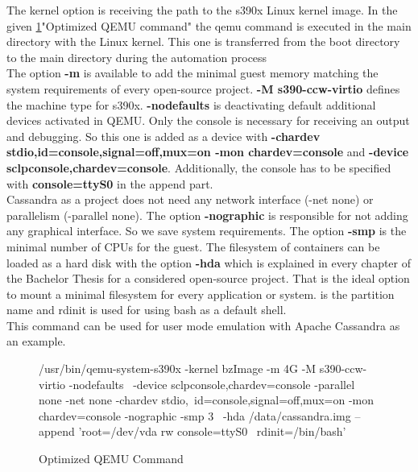 The kernel option is receiving the path to the s390x Linux kernel image. In the given \ref{QEMU-Command}"Optimized QEMU command" the qemu command is executed in the main directory with the Linux kernel. This one is transferred from the boot directory to the main directory during the automation process \\  
The option \textbf{-m} is available to add the minimal guest memory matching the system requirements of every open-source project. \textbf{-M s390-ccw-virtio} defines the machine type for s390x.
\textbf{-nodefaults} is deactivating default additional devices activated in QEMU. 
Only the console is necessary for receiving an output and debugging. 
So this one is added as a device with \textbf{-chardev stdio,id=console,signal=off,mux=on -mon chardev=console} and \textbf{-device sclpconsole,chardev=console}. Additionally, the console has to be specified with \textbf{console=ttyS0} in the append part. \\ 
Cassandra as a project does not need any network interface (-net none) or parallelism (-parallel none). The option \textbf{-nographic} is responsible for not adding any graphical interface. 
So we save system requirements. The option \textbf{-smp} is the minimal number of CPUs for the guest. 
The filesystem of containers can be loaded as a hard disk with the option \textbf{-hda} which is explained in every chapter of the Bachelor Thesis for a considered open-source project. 
That is the ideal option to mount a minimal filesystem for every application or system. 
 is the partition name and rdinit is used for using bash as a default shell. \\
This command can be used for user mode emulation with Apache Cassandra as an example.


\begin{figure}[H]
\centering
\begin{boxedverbatim}
/usr/bin/qemu-system-s390x -kernel bzImage -m 4G -M s390-ccw-virtio -nodefaults \
-device sclpconsole,chardev=console -parallel none -net none -chardev stdio,\
id=console,signal=off,mux=on -mon chardev=console -nographic -smp 3 \
-hda /data/cassandra.img  --append 'root=/dev/vda rw console=ttyS0 \
rdinit=/bin/bash'
\end{boxedverbatim}
 \caption{Optimized QEMU Command}
    \label{QEMU-Command}
\end{figure}

